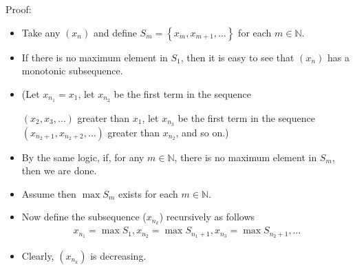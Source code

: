 \documentclass[12pt,a4paper]{article}
\begin{document}
Proof:
\begin{itemize}
    \item Take any \(\left(x_n\right)\) and define \(S_m=\left\{x_m, x_{m+1}, \ldots\right\}\) for each \(m \in \mathbb{N}\).
    \item If there is no maximum element in \(S_1\), then it is easy to see that \(\left(x_n\right)\) has a monotonic subsequence.
    
    \item (Let \(x_{n_1}=x_1\), let \(x_{n_2}\) be the first term in the sequence 
    
    \(\left(x_2, x_3, \ldots\right)\) greater than \(x_1\), let \(x_{n_3}\) 
    be the first term in the sequence \(\left(x_{n_2+1}, x_{n_2+2}, \ldots\right)\) 
    greater than \(x_{n_2}\), and so on.)
    \item By the same logic, if, for any \(m \in \mathbb{N}\), there is no maximum element in \(S_m\), then we are done.
    \item Assume then \(\max S_m\) exists for each \(m \in \mathbb{N}\).
    \item Now define the subsequence (\(x_{n_k}\)) recursively as follows
    \begin{align*}
    x_{n_1}=\max S_1, x_{n_2}=\max S_{n_1+1}, x_{n_3}=\max S_{n_2+1}, \ldots
    \end{align*}
    \item Clearly, \(\left(x_{n_k}\right)\) is decreasing.
\end{itemize}
\end{document}
